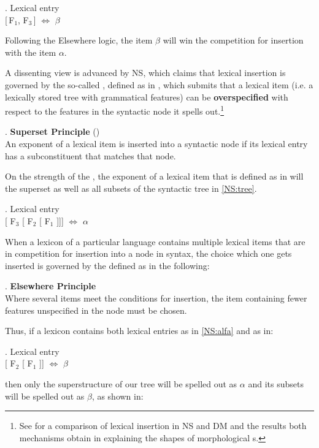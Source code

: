 \ex. Lexical entry\\[0.5ex]
[\,F$_{1}$, F$_{3}$\,] $\Leftrightarrow$ $\beta$

Following the Elsewhere logic, the item $\beta$ will win the competition for insertion with the item 
$\alpha$.
\par
A dissenting view is advanced by NS,  which claims that lexical insertion is governed by the so-called , defined as in \Next, which submits that a lexical item (i.e. a lexically stored tree with grammatical features) can be \textbf{overspecified} with respect to the features in the syntactic node it spells out.\footnote{See \cite{Caha2018} for a comparison of lexical insertion in NS and DM  and the results both mechanisms obtain in explaining the shapes of morphological s. 
} %

\ex. \textbf{Superset Principle} (\citealt{Starke2009})\label{superset}\\[0.5ex]
An exponent of a lexical item is inserted into a syntactic node if its lexical entry has a subconstituent that matches that node. 

On the strength of the , the exponent of a lexical item that is defined as in \Next will  the superset as well as all subsets of the syntactic tree in \ref{NS:tree}.

\ex.\label{NS:alfa}  Lexical entry\\[0.5ex]
[ F$_{3}$ [ F$_{2}$ [ F$_{1}$ ]]] $\Leftrightarrow$ $\alpha$ 

When a lexicon of a particular language contains multiple lexical items that are in competition for insertion into a node in syntax, the choice which one gets inserted is governed by the  defined as in the following:

\ex. \textbf{Elsewhere Principle}\label{NS:elsewhere}\\
Where several items meet the conditions for insertion, the item containing fewer features unspecified in the node must be chosen.

Thus, if a lexicon contains both lexical entries as in \ref{NS:alfa} and as in:

\ex.\label{NS:beta} Lexical entry\\[0.5ex]
[ F$_{2}$ [ F$_{1}$ ]] $\Leftrightarrow$ $\beta$

then only the superstructure of our tree will be spelled out as $\alpha$ and its subsets will be spelled out as $\beta$, as shown in:

